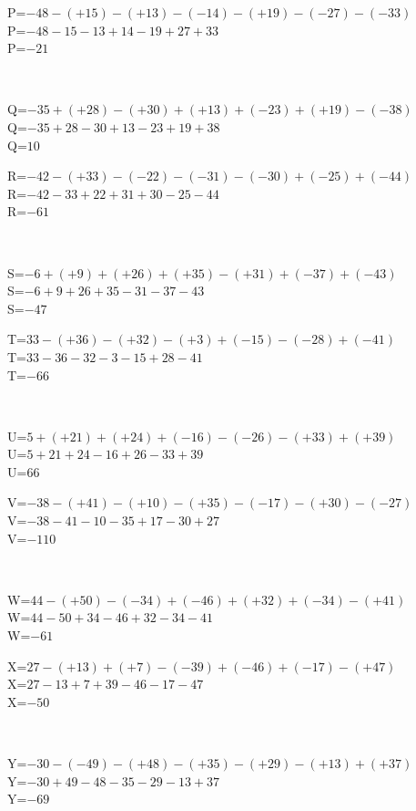\documentclass{article}%
\begin{document}
\begin{minipage}{0.5\textwidth}%
P=$-48-(+15)-(+13)-(-14)-(+19)-(-27)-(-33)$\\%
P=$-48-15-13+14-19+27+33$\\%
P=$-21$\\%
\end{minipage}%
\\%
\begin{minipage}{0.5\textwidth}%
Q=$-35+(+28)-(+30)+(+13)+(-23)+(+19)-(-38)$\\%
Q=$-35+28-30+13-23+19+38$\\%
Q=$10$\\%
\end{minipage}%
\begin{minipage}{0.5\textwidth}%
R=$-42-(+33)-(-22)-(-31)-(-30)+(-25)+(-44)$\\%
R=$-42-33+22+31+30-25-44$\\%
R=$-61$\\%
\end{minipage}%
\\%
\begin{minipage}{0.5\textwidth}%
S=$-6+(+9)+(+26)+(+35)-(+31)+(-37)+(-43)$\\%
S=$-6+9+26+35-31-37-43$\\%
S=$-47$\\%
\end{minipage}%
\begin{minipage}{0.5\textwidth}%
T=$33-(+36)-(+32)-(+3)+(-15)-(-28)+(-41)$\\%
T=$33-36-32-3-15+28-41$\\%
T=$-66$\\%
\end{minipage}%
\\%
\begin{minipage}{0.5\textwidth}%
U=$5+(+21)+(+24)+(-16)-(-26)-(+33)+(+39)$\\%
U=$5+21+24-16+26-33+39$\\%
U=$66$\\%
\end{minipage}%
\begin{minipage}{0.5\textwidth}%
V=$-38-(+41)-(+10)-(+35)-(-17)-(+30)-(-27)$\\%
V=$-38-41-10-35+17-30+27$\\%
V=$-110$\\%
\end{minipage}%
\\%
\begin{minipage}{0.5\textwidth}%
W=$44-(+50)-(-34)+(-46)+(+32)+(-34)-(+41)$\\%
W=$44-50+34-46+32-34-41$\\%
W=$-61$\\%
\end{minipage}%
\begin{minipage}{0.5\textwidth}%
X=$27-(+13)+(+7)-(-39)+(-46)+(-17)-(+47)$\\%
X=$27-13+7+39-46-17-47$\\%
X=$-50$\\%
\end{minipage}%
\\%
\begin{minipage}{0.5\textwidth}%
Y=$-30-(-49)-(+48)-(+35)-(+29)-(+13)+(+37)$\\%
Y=$-30+49-48-35-29-13+37$\\%
Y=$-69$\\%
\end{minipage}

%
\end{document}
